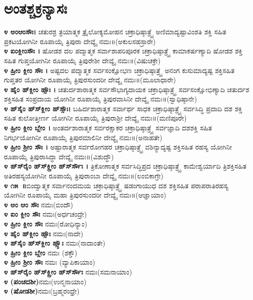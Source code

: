 \section{ಅಂತಶ್ಚಕ್ರನ್ಯಾಸಃ}
{\bfseries ೪ ಅಂಆಂಸೌಃ।} ಚತುರಶ್ರ ತ್ರಯಾತ್ಮಕ ತ್ರೈಲೋಕ್ಯಮೋಹನ ಚಕ್ರಾಧಿಷ್ಠಾತ್ರ್ಯೈ ಅಣಿಮಾದ್ಯಷ್ಟಾವಿಂಶತಿ ಶಕ್ತಿ ಸಹಿತ ಪ್ರಕಟಯೋಗಿನೀ ರೂಪಾಯೈ  ತ್ರಿಪುರಾ ದೇವ್ಯೈ ನಮಃ॥(ಅಕುಲಸಹಸ್ರಾರೇ)\\
{\bfseries ೪ ಐಂಕ್ಲೀಂಸೌಃ ।} ಷೋಡಶ ದಲ ಪದ್ಮಾತ್ಮಕ ಸರ್ವಾಶಾಪರಿಪೂರಕ ಚಕ್ರಾಧಿಷ್ಠಾತ್ರ್ಯೈ ಕಾಮಾಕರ್ಷಣ್ಯಾದಿ ಷೋಡಶ ಶಕ್ತಿ ಸಹಿತ ಗುಪ್ತಯೋಗಿನೀ ರೂಪಾಯೈ  ತ್ರಿಪುರೇಶೀ ದೇವ್ಯೈ ನಮಃ॥(ವಿಷುಚಕ್ರೇ)\\
{\bfseries ೪ ಹ್ರೀಂ ಕ್ಲೀಂ ಸೌಃ ।} ಅಷ್ಟದಲ ಪದ್ಮಾತ್ಮಕ ಸರ್ವಸಂಕ್ಷೋಭಣ ಚಕ್ರಾಧಿಷ್ಠಾತ್ರ್ಯೈ ಅನಂಗ ಕುಸುಮಾದ್ಯಷ್ಟ ಶಕ್ತಿಸಹಿತ ಗುಪ್ತತರ ಯೋಗಿನೀ ರೂಪಾಯೈ  ತ್ರಿಪುರಸುಂದರೀ ದೇವ್ಯೈ ನಮಃ॥(ಮೂಲಾಧಾರೇ)\\
{\bfseries ೪ ಹೈಂ ಹ್‌ಕ್ಲೀಂ ಹ್ಸೌಃ ।} ಚತುರ್ದಶಾರಾತ್ಮಕ ಸರ್ವಸೌಭಾಗ್ಯದಾಯಕ ಚಕ್ರಾಧಿಷ್ಠಾತ್ರ್ಯೈ ಸರ್ವಸಂಕ್ಷೋಭಿಣ್ಯಾದಿ ಚತುರ್ದಶ ಶಕ್ತಿಸಹಿತ ಸಂಪ್ರದಾಯ ಯೋಗಿನೀ ರೂಪಾಯೈ  ತ್ರಿಪುರವಾಸಿನೀ ದೇವ್ಯೈ ನಮಃ॥(ಸ್ವಾಧಿಷ್ಠಾನೇ)\\
{\bfseries ೪ ಹ್‌ಸೈಂ ಹ್‌ಸ್‌ಕ್ಲೀಂ ಹ್‌ಸ್ಸೌಃ।} ಬಹಿರ್ದಶಾರಾತ್ಮಕ ಸರ್ವಾರ್ಥ ಸಾಧಕ ಚಕ್ರಾಧಿಷ್ಠಾತ್ರ್ಯೈ ಸರ್ವಸಿದ್ಧಿ ಪ್ರದಾದಿ ದಶ ಶಕ್ತಿ ಸಹಿತ ಕುಲೋತ್ತೀರ್ಣ ಯೋಗಿನೀ ರೂಪಾಯೈ  ತ್ರಿಪುರಾಶ್ರೀ ದೇವ್ಯೈ ನಮಃ॥(ಮಣಿಪೂರೇ)\\
{\bfseries ೪ ಹ್ರೀಂ ಕ್ಲೀಂ ಬ್ಲೇಂ ।} ಅಂತರ್ದಶಾರಾತ್ಮಕ ಸರ್ವರಕ್ಷಾಕರ ಚಕ್ರಾಧಿಷ್ಠಾತ್ರ್ಯೈ ಸರ್ವಜ್ಞಾದಿ ದಶಶಕ್ತಿ ಸಹಿತ ನಿಗರ್ಭಯೋಗಿನೀ ರೂಪಾಯೈ  ತ್ರಿಪುರಮಾಲಿನೀ ದೇವ್ಯೈ ನಮಃ॥(ಅನಾಹತೇ)\\
{\bfseries ೪ ಹ್ರೀಂ ಶ್ರೀಂ ಸೌಃ ।} ಅಷ್ಟಾರಾತ್ಮಕ ಸರ್ವರೋಗಹರ ಚಕ್ರಾಧಿಷ್ಠಾತ್ರ್ಯೈ ವಶಿನ್ಯಾದ್ಯಷ್ಟ ಶಕ್ತಿಸಹಿತ ರಹಸ್ಯ ಯೋಗಿನೀ ರೂಪಾಯೈ  ತ್ರಿಪುರಾಸಿದ್ಧಾ ದೇವ್ಯೈ ನಮಃ॥(ವಿಶುದ್ಧೌ)\\
{\bfseries ೪ ಹ್‌ಸ್‌ರೈಂ ಹ್‌ಸ್‌ಕ್ಲ್ರೀಂ ಹ್‌ಸ್‌ರ್ಸೌಃ ।} ತ್ರಿಕೋಣಾತ್ಮಕ ಸರ್ವಸಿದ್ಧಿಪ್ರದ ಚಕ್ರಾಧಿಷ್ಠಾತ್ರ್ಯೈ ಕಾಮೇಶ್ವರ್ಯಾದಿ ತ್ರಿಶಕ್ತಿಸಹಿತ ಅತಿರಹಸ್ಯಯೋಗಿನೀ ರೂಪಾಯೈ  ತ್ರಿಪುರಾಂಬಾ ದೇವ್ಯೈ ನಮಃ॥(ಲಂಬಿಕಾಗ್ರೇ)\\
{\bfseries ೪ ೧೫~॥}ಬಿಂದ್ವಾತ್ಮಕ ಸರ್ವಾನಂದಮಯ ಚಕ್ರಾಧಿಷ್ಠಾತ್ರ್ಯೈ ಷಡಂಗಾಯುಧ ದಶ ಶಕ್ತಿಸಹಿತ ಪರಾಪರಾತಿರಹಸ್ಯ ಯೋಗಿನೀ ರೂಪಾಯೈ ಮಹಾ ತ್ರಿಪುರಸುಂದರೀ ದೇವ್ಯೈ ನಮಃ॥(ಆಜ್ಞಾಯಾಂ)\\
{\bfseries ೪ ಅಂ ಆಂ ಸೌಃ} ನಮಃ(ಬಿಂದೌ)\\
{\bfseries ೪ ಐಂ ಕ್ಲೀಂ ಸೌಃ} ನಮಃ(ಅರ್ಧಚಂದ್ರೇ)\\
{\bfseries ೪ ಹ್ರೀಂ ಕ್ಲೀಂ ಸೌಃ} ನಮಃ(ರೋಧಿನ್ಯಾಂ)\\
{\bfseries ೪ ಹೈಂ ಹ್‌ಕ್ಲೀಂ ಹ್ಸೌಃ} ನಮಃ(ನಾದೇ)\\
{\bfseries ೪ ಹ್‌ಸೈಂ ಹ್‌ಸ್‌ಕ್ಲೀಂ ಹ್ಸ್ಸೌಃ} ನಮಃ(ನಾದಾಂತೇ)\\
{\bfseries ೪ ಹ್ರೀಂ ಕ್ಲೀಂ ಬ್ಲೇಂ} ನಮಃ (ಶಕ್ತೌ)\\
{\bfseries ೪ ಹ್ರೀಂ ಶ್ರೀಂ ಸೌಃ} ನಮಃ (ವ್ಯಾಪಿಕಾಯಾಂ)\\
{\bfseries ೪ ಹ್‌ಸ್‌ರೈಂ ಹ್‌ಸ್‌ಕ್ಲ್ರೀಂ ಹ್‌ಸ್‌ರ್ಸೌಃ} ನಮಃ(ಸಮನಾಯಾಂ)\\
{\bfseries ೪ (ಪಂಚದಶೀ)}ನಮಃ(ಉನ್ಮನಾಯಾಂ)\\
{\bfseries ೪ (ಷೋಡಶೀ)}ನಮಃ(ಬ್ರಹ್ಮರಂಧ್ರೇ)
